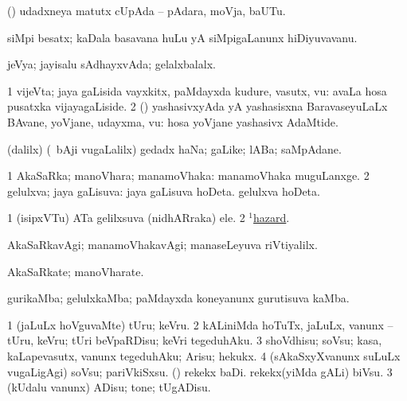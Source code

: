 \bentry
{}
\gl{\nA}
\bmng
(\ashi) udadxneya matutx cUpAda -- pAdara, moVja, baUTu. 
\emng
\eentry

\bentry
{}
\gl{\nA}
\bmng
siMpi besatx; kaDala basavana huLu yA siMpigaLanunx hiDiyuvavanu. 
\emng
\eentry

\bentry
{}
\gl{\gu}
\bmng
jeVya; jayisalu sAdhayxvAda; gelalxbalalx. 
\emng
\eentry

\bentry
{}
\gl{\nA}
\bmng
\bnum
\num{1} vijeVta; jaya gaLisida vayxkitx, paMdayxda kudure, vasutx, \mo vu:  avaLa hosa pusatxka vijayagaLiside. 
\num{2} (\AmA) yashasivxyAda yA yashasisxna BaravaseyuLaLx BAvane, yoVjane, udayxma, \mo vu:  hosa yoVjane yashasivx AdaMtide. 
\enum
\emng
\eentry

\bentry
{} 
\gl{\nA}
\expl{}
\bmng
(\bava dalilx) (\kanmu\ bAji \mo vugaLalilx) gedadx haNa; gaLike; lABa; saMpAdane. 
\emng
\eentry

\bentry
{} 
\gl{\gu}
\expl{}
\bmng
\bnum
\num{1} AkaSaRka; manoVhara; manamoVhaka:  manamoVhaka muguLanxge. 
\num{2} gelulxva; jaya gaLisuva:  jaya gaLisuva hoDeta.  gelulxva hoDeta. 
\enum
\emng

\noindent 
\gl{\pagu}
\expl{}
\bmng
\bnum
\num{1}  (isipxVTu) ATa gelilxsuva (nidhARraka) ele. 
\num{2}  \hyperref{kandict_h.pdf}{H}{hazard(1) pagu(4)}{$^1$hazard}. 
\enum
\emng
\eentry

\bentry
{}
\gl{\kirxvi}
\bmng
AkaSaRkavAgi; manamoVhakavAgi; manaseLeyuva riVtiyalilx. 
\emng
\eentry

\bentry
{}
\gl{\nA}
\bmng
AkaSaRkate; manoVharate. 
\emng
\eentry

\bentry
{}
\gl{\nA}
\bmng
gurikaMba; gelulxkaMba; paMdayxda koneyanunx gurutisuva kaMba. 
\emng
\eentry

\bentry
{}
\gl{\sakirx}
\bmng
\bnum
\num{1} (jaLuLx hoVguvaMte) tUru; keVru. 
\num{2} kALiniMda hoTuTx, jaLuLx, \mo vanunx -- tUru, keVru; tUri beVpaRDisu; keVri tegeduhAku. 
\num{3} shoVdhisu; soVsu; kasa, kaLapevasutx, \mo vanunx tegeduhAku; Arisu; hekukx. 
\num{4} (sAkaSxyXvanunx suLuLx \mo vugaLigAgi) soVsu; pariVkiSxsu. 
 (\kAparx) 
\banum
{} rekekx baDi. 
 rekekx(yiMda gALi) biVsu. 
\eanum
\numie
\num{3} (kUdalu \mo vanunx) ADisu; tone; tUgADisu. 
\enum
\emng
\eentry

